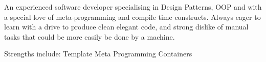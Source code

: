 An experienced software developer specialising in Design Patterns, OOP and with
a special love of meta-programming and compile time constructs. Always eager to
learn with a drive to produce clean elegant code, and strong dislike of manual
tasks that could be more easily be done by a machine.

Strengths include:
\newline{} \newline{}
             {Template Meta Programming}
                {Containers}

